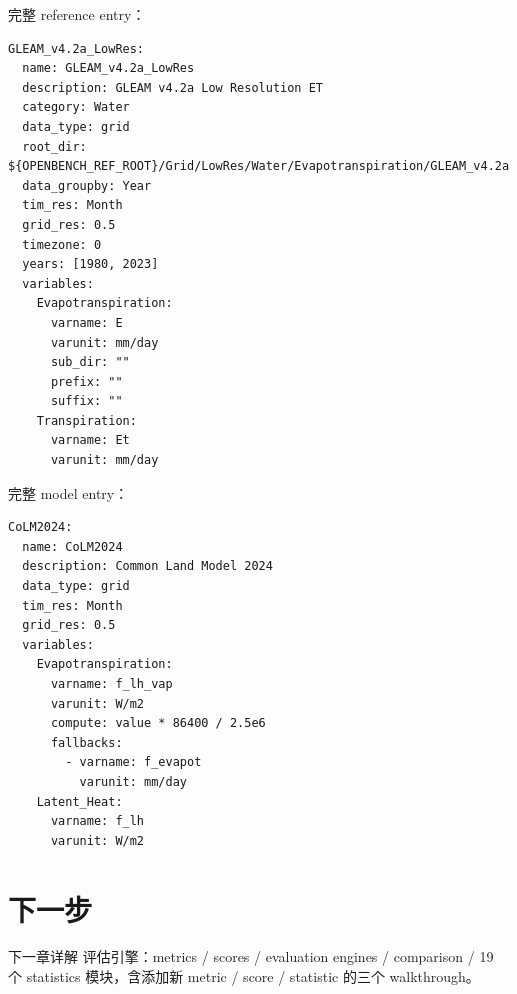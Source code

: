 完整 reference entry：

\begin{verbatim}
GLEAM_v4.2a_LowRes:
  name: GLEAM_v4.2a_LowRes
  description: GLEAM v4.2a Low Resolution ET
  category: Water
  data_type: grid
  root_dir: ${OPENBENCH_REF_ROOT}/Grid/LowRes/Water/Evapotranspiration/GLEAM_v4.2a
  data_groupby: Year
  tim_res: Month
  grid_res: 0.5
  timezone: 0
  years: [1980, 2023]
  variables:
    Evapotranspiration:
      varname: E
      varunit: mm/day
      sub_dir: ""
      prefix: ""
      suffix: ""
    Transpiration:
      varname: Et
      varunit: mm/day
\end{verbatim}

完整 model entry：

\begin{verbatim}
CoLM2024:
  name: CoLM2024
  description: Common Land Model 2024
  data_type: grid
  tim_res: Month
  grid_res: 0.5
  variables:
    Evapotranspiration:
      varname: f_lh_vap
      varunit: W/m2
      compute: value * 86400 / 2.5e6
      fallbacks:
        - varname: f_evapot
          varunit: mm/day
    Latent_Heat:
      varname: f_lh
      varunit: W/m2
\end{verbatim}

\section{下一步}

下一章详解  评估引擎：metrics / scores / evaluation engines / comparison / 19 个 statistics 模块，含添加新 metric / score / statistic 的三个 walkthrough。
